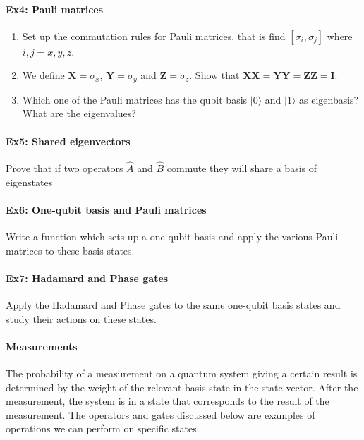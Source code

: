 \paragraph{Ex4: Pauli matrices}
\begin{enumerate}
\item Set up the commutation rules for Pauli matrices, that is find $[\sigma_i,\sigma_j]$ where $i,j=x,y,z$.

\item We define $\bm{X}=\sigma_x$, $\bm{Y}=\sigma_y$ and $\bm{Z}=\sigma_z$. Show that $\bm{XX}=\bm{YY}=\bm{ZZ}=\bm{I}$.

\item Which one of the Pauli matrices has the qubit basis $\vert 0\rangle$ and $\vert 1\rangle$ as eigenbasis? What are the eigenvalues?
\end{enumerate}



\paragraph{Ex5: Shared eigenvectors}

Prove that if two operators $\hat{A}$ and $\hat{B}$ commute they will share a basis of eigenstates


\paragraph{Ex6: One-qubit basis and  Pauli matrices}

Write a function which sets up a one-qubit basis and apply the various Pauli matrices to these basis states.


\paragraph{Ex7: Hadamard and Phase gates}

Apply the Hadamard and Phase gates to the same one-qubit basis states and study their actions on these states.


\paragraph{Measurements}

The probability of a measurement on a quantum system giving a certain
result is determined by the weight of the relevant basis state in the
state vector. After the measurement, the system is in a state that
corresponds to the result of the measurement. The operators and
gates discussed below are examples of operations we can perform on
specific states.

